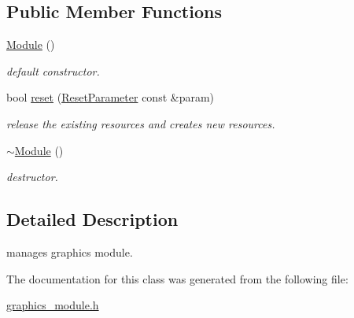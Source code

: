 \subsection*{Public Member Functions}
\begin{DoxyCompactItemize}
\item 
\hypertarget{classhryky_1_1graphics_1_1_module_a82d522acf9ff4225bf03a7d3dbf85843}{\hyperlink{classhryky_1_1graphics_1_1_module_a82d522acf9ff4225bf03a7d3dbf85843}{Module} ()}\label{classhryky_1_1graphics_1_1_module_a82d522acf9ff4225bf03a7d3dbf85843}

\begin{DoxyCompactList}\small\item\em default constructor. \end{DoxyCompactList}\item 
\hypertarget{classhryky_1_1graphics_1_1_module_a5c8abe754f63338ef1f62392e93e3306}{bool \hyperlink{classhryky_1_1graphics_1_1_module_a5c8abe754f63338ef1f62392e93e3306}{reset} (\hyperlink{structhryky_1_1graphics_1_1_module_1_1_reset_parameter}{Reset\-Parameter} const \&param)}\label{classhryky_1_1graphics_1_1_module_a5c8abe754f63338ef1f62392e93e3306}

\begin{DoxyCompactList}\small\item\em release the existing resources and creates new resources. \end{DoxyCompactList}\item 
\hypertarget{classhryky_1_1graphics_1_1_module_a0abae9a343c3fc1bb8252247f926636a}{\hyperlink{classhryky_1_1graphics_1_1_module_a0abae9a343c3fc1bb8252247f926636a}{$\sim$\-Module} ()}\label{classhryky_1_1graphics_1_1_module_a0abae9a343c3fc1bb8252247f926636a}

\begin{DoxyCompactList}\small\item\em destructor. \end{DoxyCompactList}\end{DoxyCompactItemize}


\subsection{Detailed Description}
manages graphics module. 

The documentation for this class was generated from the following file\-:\begin{DoxyCompactItemize}
\item 
\hyperlink{graphics__module_8h}{graphics\-\_\-module.\-h}\end{DoxyCompactItemize}
